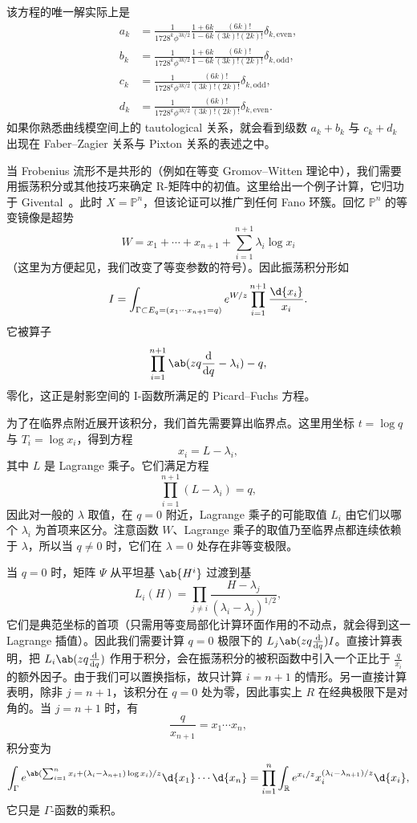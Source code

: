 \documentclass{amsart}
\theoremstyle{definition}
\theoremstyle{remark}
\theoremstyle{plain}
\theoremstyle{definition}
\theoremstyle{remark}
\newcommand{\R}{\mathbb{R}}
\renewcommand{\P}{\mathbb{P}}
\newcommand{\1}{\mathbf{1}}
\newcommand{\2}{\mathbf{2}}
\newcommand{\3}{\mathbf{3}}
\begin{document}
该方程的唯一解实际上是
\begin{align*}
    a_k &= \frac{1}{1728^k \phi^{3k/2}} \frac{1+6k}{1-6k} \frac{(6k)!}{(3k)!(2k)!} \delta_{k, \text{even}},  \\
    b_k &= \frac{1}{1728^k \phi^{3k/2}} \frac{1+6k}{1-6k}\frac{(6k)!}{(3k)!(2k)!} \delta_{k, \text{odd}},  \\
    c_k &= \frac{1}{1728^k \phi^{3k/2}}\frac{(6k)!}{(3k)!(2k)!} \delta_{k, \text{odd}}, \\
    d_k &= \frac{1}{1728^k \phi^{3k/2}} \frac{(6k)!}{(3k)!(2k)!} \delta_{k, \text{even}}.
\end{align*}
如果你熟悉曲线模空间上的 tautological 关系，就会看到级数 \(a_k + b_k\) 与 \(c_k + d_k\) 出现在 Faber--Zagier 关系与 Pixton 关系的表述之中。

当 Frobenius 流形不是共形的（例如在等变 Gromov--Witten 理论中），我们需要用振荡积分或其他技巧来确定 R-矩阵中的初值。这里给出一个例子计算，它归功于 Givental~\cite{Givental2001semisimple}。此时 \(X = \P^n\)，但该论证可以推广到任何 Fano 环簇。回忆 \(\P^n\) 的等变镜像是超势
\[ W = x_1 + \cdots + x_{n+1} + \sum_{i=1}^{n+1} \lambda_i \log x_i \]
（这里为方便起见，我们改变了等变参数的符号）。因此振荡积分形如
\[ I = \int_{\Gamma \subset E_q = (x_1 \cdots x_{n+1}=q)} e^{W/z} \prod_{i=1}^{n+1} \frac{\d{x_i}}{x_i}. \]
它被算子
\[ \prod_{i=1}^{n+1}\ab(zq \odv{}{q} -\lambda_i) - q, \]
零化，这正是射影空间的 I-函数所满足的 Picard--Fuchs 方程。

为了在临界点附近展开该积分，我们首先需要算出临界点。这里用坐标 \(t = \log q\) 与 \(T_i = \log x_i\)，得到方程
\[ x_i = L - \lambda_i, \]
其中 \(L\) 是 Lagrange 乘子。它们满足方程
\[ \prod_{i=1}^{n+1} (L - \lambda_i) = q, \]
因此对一般的 \(\lambda\) 取值，在 \(q = 0\) 附近，Lagrange 乘子的可能取值 \(L_i\) 由它们以哪个 \(\lambda_i\) 为首项来区分。注意函数 \(W\)、Lagrange 乘子的取值乃至临界点都连续依赖于 \(\lambda\)，所以当 \(q \neq 0\) 时，它们在 \(\lambda = 0\) 处存在非等变极限。

当 \(q = 0\) 时，矩阵 \(\Psi\) 从平坦基 \(\ab{H^i}\) 过渡到基
\[ L_i(H) = \prod_{j \neq i} \frac{H - \lambda_j}{(\lambda_i - \lambda_j)^{1/2}}, \]
它们是典范坐标的首项（只需用等变局部化计算环面作用的不动点，就会得到这一 Lagrange 插值）。因此我们需要计算 \(q = 0\) 极限下的 \(L_j \ab(z q \odv{}{q}) I\)。直接计算表明，把 \(L_i \ab(z q \odv{}{q})\) 作用于积分，会在振荡积分的被积函数中引入一个正比于 \(\frac{q}{x_i}\) 的额外因子。由于我们可以置换指标，故只计算 \(i = n+1\) 的情形。另一直接计算表明，除非 \( j = n+1\)，该积分在 \(q = 0\) 处为零，因此事实上 \(R\) 在经典极限下是对角的。当 \(j = n+1\) 时，有
\[ \frac{q}{x_{n+1}} = x_1 \cdots x_n, \]
积分变为
\[ \int_{\Gamma} e^{\ab( \sum_{i=1}^n x_i + (\lambda_i - \lambda_{n+1})\log x_i ) / z} \d{x_1} \cdots \d{x_n} = \prod_{i=1}^n \int_{\R} e^{x_i/z} x_i^{(\lambda_i - \lambda_{n+1})/z} \d{x_i}, \]
它只是 \(\Gamma\)-函数的乘积。
\end{document}
